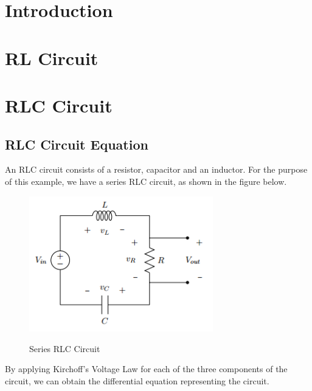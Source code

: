 \documentclass[12pt,twoside]{article}
\begin{document}


\tableofcontents




\newpage
\section{Introduction}


\newpage
\section{RL Circuit}


\newpage
\section{RLC Circuit}

\subsection{RLC Circuit Equation}

An RLC circuit consists of a resistor, capacitor and an inductor. For the purpose of this example, we have a series RLC circuit, as shown in the figure below.

\begin{figure}[h]
\centering
\includegraphics[width = 8cm]{./figures/RLC.PNG}\\[0.01cm]
\caption{Series RLC Circuit}
\end{figure}

By applying Kirchoff's Voltage Law for each of the three components of the circuit, we can obtain the differential equation representing the circuit.
\end{document}
